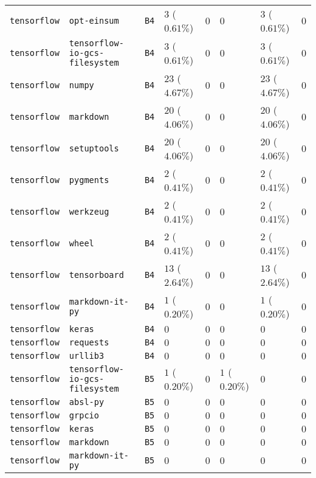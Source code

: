 \begin{table}
\begin{tabular}{llllllll}
\texttt{tensorflow} & \texttt{opt-einsum} & \texttt{B4} & $3$ ($0.61\%$) & $0$ & $0$ & $3$ ($0.61\%$) & $0$ \\
\texttt{tensorflow} & \texttt{tensorflow-io-gcs-filesystem} & \texttt{B4} & $3$ ($0.61\%$) & $0$ & $0$ & $3$ ($0.61\%$) & $0$ \\
\texttt{tensorflow} & \texttt{numpy} & \texttt{B4} & $23$ ($4.67\%$) & $0$ & $0$ & $23$ ($4.67\%$) & $0$ \\
\texttt{tensorflow} & \texttt{markdown} & \texttt{B4} & $20$ ($4.06\%$) & $0$ & $0$ & $20$ ($4.06\%$) & $0$ \\
\texttt{tensorflow} & \texttt{setuptools} & \texttt{B4} & $20$ ($4.06\%$) & $0$ & $0$ & $20$ ($4.06\%$) & $0$ \\
\texttt{tensorflow} & \texttt{pygments} & \texttt{B4} & $2$ ($0.41\%$) & $0$ & $0$ & $2$ ($0.41\%$) & $0$ \\
\texttt{tensorflow} & \texttt{werkzeug} & \texttt{B4} & $2$ ($0.41\%$) & $0$ & $0$ & $2$ ($0.41\%$) & $0$ \\
\texttt{tensorflow} & \texttt{wheel} & \texttt{B4} & $2$ ($0.41\%$) & $0$ & $0$ & $2$ ($0.41\%$) & $0$ \\
\texttt{tensorflow} & \texttt{tensorboard} & \texttt{B4} & $13$ ($2.64\%$) & $0$ & $0$ & $13$ ($2.64\%$) & $0$ \\
\texttt{tensorflow} & \texttt{markdown-it-py} & \texttt{B4} & $1$ ($0.20\%$) & $0$ & $0$ & $1$ ($0.20\%$) & $0$ \\
\texttt{tensorflow} & \texttt{keras} & \texttt{B4} & $0$ & $0$ & $0$ & $0$ & $0$ \\
\texttt{tensorflow} & \texttt{requests} & \texttt{B4} & $0$ & $0$ & $0$ & $0$ & $0$ \\
\texttt{tensorflow} & \texttt{urllib3} & \texttt{B4} & $0$ & $0$ & $0$ & $0$ & $0$ \\
\texttt{tensorflow} & \texttt{tensorflow-io-gcs-filesystem} & \texttt{B5} & $1$ ($0.20\%$) & $0$ & $1$ ($0.20\%$) & $0$ & $0$ \\
\texttt{tensorflow} & \texttt{absl-py} & \texttt{B5} & $0$ & $0$ & $0$ & $0$ & $0$ \\
\texttt{tensorflow} & \texttt{grpcio} & \texttt{B5} & $0$ & $0$ & $0$ & $0$ & $0$ \\
\texttt{tensorflow} & \texttt{keras} & \texttt{B5} & $0$ & $0$ & $0$ & $0$ & $0$ \\
\texttt{tensorflow} & \texttt{markdown} & \texttt{B5} & $0$ & $0$ & $0$ & $0$ & $0$ \\
\texttt{tensorflow} & \texttt{markdown-it-py} & \texttt{B5} & $0$ & $0$ & $0$ & $0$ & $0$ \\

\end{tabular}
\end{table}
